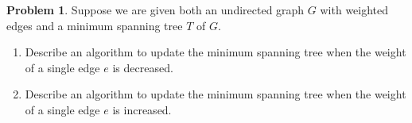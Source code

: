 \documentclass{article}
\theoremstyle{definition}
\newtheorem{problem}{Problem}
\begin{document}
\newpage




\begin{problem}
Suppose we are given both an undirected graph $G$ with weighted edges and a minimum spanning tree $T$ of $G$.
\begin{enumerate}
    \item [(a)]Describe an algorithm to update the minimum spanning tree when the weight of a single edge $e$ is decreased.
\item[(b)] Describe an algorithm to update the minimum spanning tree when the weight of a single edge $e$ is increased.

\end{enumerate}

\end{problem}
\end{document}
